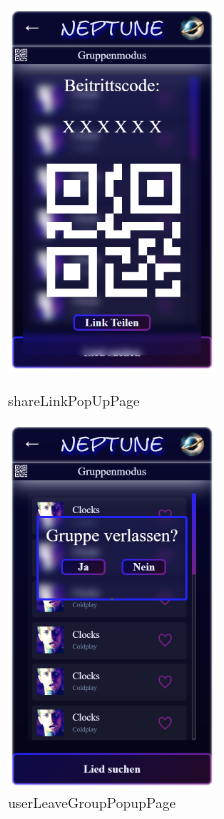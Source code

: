 \documentclass[oneside, ngerman]{sdqtechreport}
\begin{document}
\begin{figure}
   \begin{minipage}[b]{.4\linewidth} %
      \includegraphics[width=5.5cm]{LATEX/Pflichtenheft/GraphicDesigns/shareLinkPopUpPage.png}
      \caption{shareLinkPopUpPage}
   \end{minipage}
   \hspace{2cm}%
   \begin{minipage}[b]{.4\linewidth} %
      \includegraphics[width=5.5cm]{LATEX/Pflichtenheft/GraphicDesigns/userLeaveGroupPopupPage.png}
      \caption{userLeaveGroupPopupPage}
   \end{minipage}
   

\end{figure}
\end{document}
